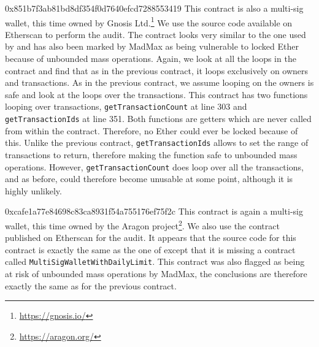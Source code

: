 \begin{investigation}{0x851b7f3ab81bd8df354f0d7640efcd7288553419}
  This contract is also a multi-sig wallet, this time owned by Gnosis Ltd.\footnote{\url{https://gnosis.io/}}
  We use the source code available on Etherscan to perform the audit.
  The contract looks very similar to the one used by  and has also been marked by MadMax as being vulnerable to locked Ether because of unbounded mass operations.
  Again, we look at all the loops in the contract and find that as in the previous contract, it loops exclusively on owners and transactions. As in the previous contract, we assume looping on the owners is safe and look at the loops over the transactions. This contract has two functions looping over transactions, \lstinline{getTransactionCount} at line 303 and \lstinline{getTransactionIds} at line 351. Both functions are getters which are never called from within the contract. Therefore, no Ether could ever be locked because of this. Unlike the previous contract, \lstinline{getTransactionIds} allows to set the range of transactions to return, therefore making the function safe to unbounded mass operations. However, \lstinline{getTransactionCount} does loop over all the transactions, and as before, could therefore become unusable at some point, although it is highly unlikely.
\end{investigation}

\begin{investigation}{0xcafe1a77e84698c83ca8931f54a755176ef75f2c}
  This contract is again a multi-sig wallet, this time owned by the Aragon project\footnote{\url{https://aragon.org/}}. We also use the contract published on Etherscan for the audit. It appears that the source code for this contract is exactly the same as the one of  except that it is missing a contract called \lstinline{MultiSigWalletWithDailyLimit}. This contract was also flagged as being at risk of unbounded mass operations by MadMax, the conclusions are therefore exactly the same as for the previous contract.
\end{investigation}

